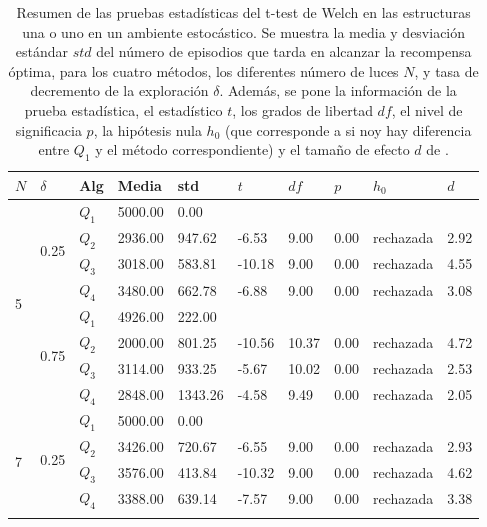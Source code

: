 \begin{table}[]
\centering
\caption{Resumen de las pruebas estadísticas del t-test de Welch en las
estructuras una o uno en un ambiente estocástico. Se muestra la media y desviación estándar $std$ del número 
de episodios que tarda en alcanzar la recompensa óptima, para los cuatro métodos, los diferentes número de luces $N$, y tasa de decremento de la exploración $\delta$. Además, se pone la información
de la prueba estadística, el estadístico $t$, los grados de libertad $df$, el nivel
de significacia $p$, la hipótesis nula $h_0$ (que corresponde a si noy hay diferencia entre $Q_1$ y el método correspondiente) y el tamaño de efecto $d$ de \citet{cohen2013statistical}.}
\label{tab:one-to-one-delta-sto}
\begin{tabular}{|l|l|l|l|l|l|l|l|l|l|}
\hline
$N$ & $\delta$ & Alg & Media & std & $t$ & $df$ & $p$ & $h_0$ & $d$ \\ \hline
\multirow{8}{*}{5} & \multirow{4}{*}{0.25} & $Q_1$ & 5000.00 & 0.00 & \multicolumn{5}{l|}{} \\ \cline{3-10} 
 &  & $Q_2$ & 2936.00 & 947.62 & -6.53 & 9.00 & 0.00 & rechazada & 2.92 \\ \cline{3-10} 
 &  & $Q_3$ & 3018.00 & 583.81 & -10.18 & 9.00 & 0.00 & rechazada & 4.55 \\ \cline{3-10} 
 &  & $Q_4$ & 3480.00 & 662.78 & -6.88 & 9.00 & 0.00 & rechazada & 3.08 \\ \cline{2-10} 
 & \multirow{4}{*}{0.75} & $Q_1$ & 4926.00 & 222.00 & \multicolumn{5}{l|}{} \\ \cline{3-10} 
 &  & $Q_2$ & 2000.00 & 801.25 & -10.56 & 10.37 & 0.00 & rechazada & 4.72 \\ \cline{3-10} 
 &  & $Q_3$ & 3114.00 & 933.25 & -5.67 & 10.02 & 0.00 & rechazada & 2.53 \\ \cline{3-10} 
 &  & $Q_4$ & 2848.00 & 1343.26 & -4.58 & 9.49 & 0.00 & rechazada & 2.05 \\ \hline
\multirow{8}{*}{7} & \multirow{4}{*}{0.25} & $Q_1$ & 5000.00 & 0.00 & \multicolumn{5}{l|}{} \\ \cline{3-10} 
 &  & $Q_2$ & 3426.00 & 720.67 & -6.55 & 9.00 & 0.00 & rechazada & 2.93 \\ \cline{3-10} 
 &  & $Q_3$ & 3576.00 & 413.84 & -10.32 & 9.00 & 0.00 & rechazada & 4.62 \\ \cline{3-10} 
 &  & $Q_4$ & 3388.00 & 639.14 & -7.57 & 9.00 & 0.00 & rechazada & 3.38 \\ \cline{2-10} 

\end{tabular}
\end{table}
